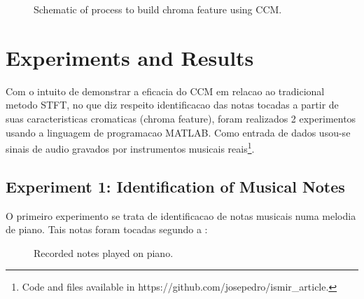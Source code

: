 \documentclass{article}
\begin{document}
	\begin{figure}[h]
	 \centerline{}
	 \caption{Schematic of process to build chroma feature using CCM.}
	 \label{fig:schematic}
	\end{figure}


\section{Experiments and Results}

	Com o intuito de demonstrar a eficacia do CCM em relacao ao tradicional metodo STFT\cite{LabROSA}, no que diz respeito identificacao das notas tocadas a partir de suas caracteristicas cromaticas (chroma feature), foram realizados 2 experimentos usando a linguagem de programacao MATLAB. Como entrada de dados usou-se sinais de audio gravados por instrumentos musicais reais\footnote{Code and files available in https://github.com/josepedro/ismir\_article.}. 

	\subsection{Experiment 1: Identification of Musical Notes}

	O primeiro experimento se trata de identificacao de notas musicais numa melodia de piano. Tais notas foram tocadas segundo a : 

	\begin{figure}[h]
	 \centerline{}
	 \caption{Recorded notes played on piano.}
	 \label{fig:1-notes}
	\end{figure}
\end{document}
